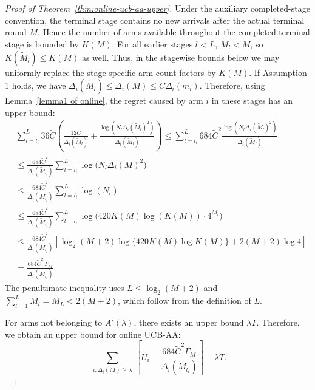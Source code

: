 \documentclass[11pt]{article}
\begin{document}
\begin{proof}[Proof of Theorem~\ref{thm:online-ucb-aa-upper}]
Under the auxiliary completed-stage convention, the terminal stage contains no
new arrivals after the actual terminal round \(M\). Hence the number of arms
available throughout the completed terminal stage is bounded by \(K(M)\). For
all earlier stages \(l<L\), \(\tilde M_l<M\), so \(K(\tilde M_l)\le K(M)\) as
well. Thus, in the stagewise bounds below we may uniformly replace the
stage-specific arm-count factors by \(K(M)\).
If Assumption 1 holds, we have $\Delta_i(\tilde{M}_l)\leq \Delta_i(M)\leq \tilde{C}\Delta_i(m_i)$. Therefore, using Lemma~\ref{lemma1 of online}, the regret caused by arm $i$ in these stages has an upper bound:
\begin{align*}
  &\sum_{l=l_i}^{L} 36\tilde{C}
  \left(\frac{12\tilde{C}}{\Delta_i(\tilde{M}_l)}
  +\frac{\log(N_l \Delta_i(\tilde{M}_l)^2)}{\Delta_i(\tilde{M}_l)}\right)
  \le \sum_{l=l_i}^{L} 684\tilde{C}^2
  \frac{\log(N_l \Delta_i(\tilde{M}_l)^2)}{\Delta_i(\tilde{M}_l)} \\
  &\le \frac{684\tilde{C}^2}{\Delta_i(\tilde{M}_{l_i})}
  \sum_{l=l_i}^{L}\log\bigl(N_l \Delta_i(M)^2\bigr) \\
  &\le \frac{684\tilde{C}^2}{\Delta_i(\tilde{M}_{l_i})}
  \sum_{l=l_i}^{L}\log(N_l)\\
  &\le \frac{684\tilde{C}^2}{\Delta_i(\tilde{M}_{l_i})}
  \sum_{l=l_i}^{L}
  \log\bigl(420K(M)\log(K(M))\cdot 4^{M_l}\bigr)\\
  &\le
  \frac{684\tilde{C}^2}{\Delta_i(\tilde{M}_{l_i})}
  \left[
  \log_2(M+2)\log\{420K(M)\log K(M)\}
  +2(M+2)\log 4
  \right]\\
  &=
  \frac{684\tilde{C}^2\,\Gamma_M}{\Delta_i(\tilde{M}_{l_i})}.
\end{align*}
The penultimate inequality uses
$L\le \log_2(M+2)$ and
$\sum_{l=1}^{L}M_l=\tilde M_L<2(M+2)$, which follow from the definition of
$L$.


For arms not belonging to $A'(\lambda)$, there exists an upper bound $\lambda T$. Therefore, we obtain an upper bound for online UCB-AA:
\begin{equation}
\label{eq:onlinebound1}
\sum_{\substack{i: \Delta_i(M) \geq \lambda}}
\left[
U_i
+\frac{684\tilde{C}^2\Gamma_M}{\Delta_i(\tilde{M}_{l_i})}
\right]+\lambda T.
\end{equation}  


\end{proof}
\end{document}
